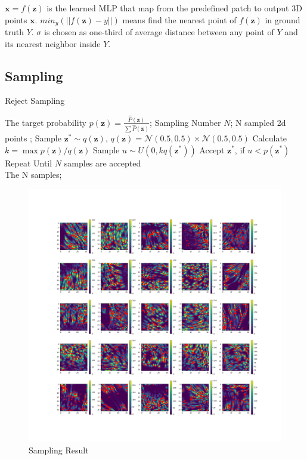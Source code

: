 $\mathbf{x}=f(\mathbf{z})$ is the learned MLP that map from the predefined patch to output 3D points $\mathbf{x}$.
$min_y(||f(\mathbf{z}) - y|| )$ means find the nearest point of $f(\mathbf{z}) $ in ground truth $Y$. $\sigma$ is chosen as one-third of average distance between any point of $Y$ and its nearest neighbor inside $Y$.

\subsection{Sampling}
\begin{algorithm}[htb] 
	\caption{ Reject Sampling } 
	\label{alg:Framwork} 
	\begin{algorithmic}[1] 
		\Require
		The target probability $p(\mathbf{z}) = \frac{\hat{P}(\mathbf{z})}{\sum \hat{P}(\mathbf{z})}$;
		Sampling Number $N$;
		\Ensure 
		N sampled 2d points ; 
		\State Sample $\mathbf{z}^* \sim q(\mathbf{z})$, $q(\mathbf{z}) = \mathcal{N}(0.5,0.5) \times \mathcal{N}(0.5,0.5)$
		\State Calculate $k = \max p(\mathbf{z}) / q(\mathbf{z})$
		\State Sample $u \sim U(0,kq(\mathbf{z^*}))$ 
		\State Accept $\mathbf{z}^*$, if $u < p(\mathbf{z^*}) $
		\State Repeat Until $N$ samples are accepted\\
		\Return The N samples; 
	\end{algorithmic} 
\end{algorithm}

\begin{figure}[t]
	\begin{center}
		\includegraphics[width=0.9\linewidth]{img/p_2190}
	\end{center}
	\caption{Sampling Result}
	\label{fig:sample}
\end{figure}



